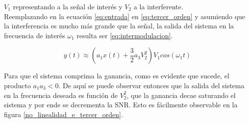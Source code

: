 \documentclass[12pt]{report}
\begin{document}
\(V_1\) representando a la señal de interés y \(V_2\) a la interferente.\\
Reemplazando en la ecuación \ref{eq:entrada} en \ref{eq:tercer_orden} y asumiendo que la interferencia es mucho más grande que la señal, 
la salida del sistema en la frecuencia de interés \(\omega_1\) resulta ser \ref{eq:intermodulacion}.

\begin{equation}\label{eq:intermodulacion}
    y(t) \approx \left( a_1 x(t) + \frac{3}{2} a_3 V_2^{2} \right) V_1  cos(\omega_1 t)
\end{equation}

Para que el sistema comprima la ganancia, como es evidente que sucede, el producto \(a_1 a_3 < 0\). De aquí se puede observar entonces que
la salida del sistema en la frecuencia deseada es función de \(V_2^{2}\), que la ganancia decae saturando el sistema y por ende se decrementa 
la SNR. Esto es fácilmente observable en la figura \ref{no_linealidad_e_tercer_orden}.
\end{document}
